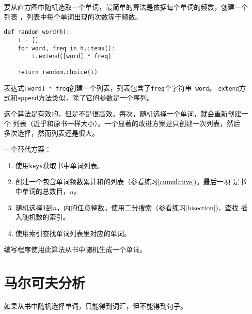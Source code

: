 
要从直方图中随机选取一个单词，最简单的算法是依据每个单词的频数，创建一个列表
，列表中每个单词出现的次数等于频数。

\beforeverb
\begin{verbatim}
def random_word(h):
    t = []
    for word, freq in h.items():
        t.extend([word] * freq)

    return random.choice(t)
\end{verbatim}
\afterverb
%



表达式{\tt [word] * freq}创建一个列表，列表包含了{\tt freq}个字符串{\tt
	word}。
{\tt extend}方式和{\tt append}方法类似，除了它的参数是一个序列。


\begin{ex}
\label{randhist}



这个算法是有效的，但是不是很高效。每次，随机选择一个单词，就会重新创建一个
列表（近乎和原书一样大小）。一个显著的改进方案是只创建一次列表，然后
多次选择，然而列表还是很大。

一个替代方案：

\begin{enumerate}

\item 使用{\tt keys}获取书中单词列表。

\item 创建一个包含单词频数累计和的列表（参看练习\ref{cumulative})。最后一项
是书中单词的总数目，$n$。

\item 随机选择1到$n$，内的任意整数。使用二分搜索（参看练习\ref{bisection})，查找
插入随机数的索引。

\item 使用索引查找单词列表里对应的单词。

\end{enumerate}

编写程序使用此算法从书中随机生成一个单词。

\end{ex}


\section{马尔可夫分析}


 如果从书中随机选择单词，只能得到词汇，但不能得到句子。

